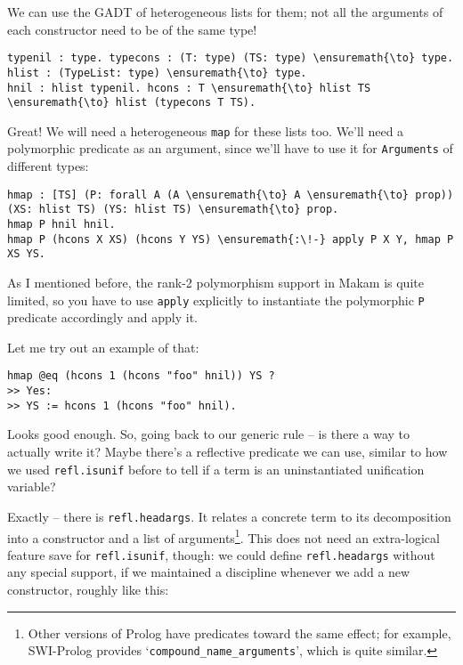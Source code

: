 \heroSTUDENT{} We can use the GADT of heterogeneous lists for them; not all
the arguments of each constructor need to be of the same type!

\begin{verbatim}
typenil : type. typecons : (T: type) (TS: type) \ensuremath{\to} type.
hlist : (TypeList: type) \ensuremath{\to} type.
hnil : hlist typenil. hcons : T \ensuremath{\to} hlist TS \ensuremath{\to} hlist (typecons T TS).
\end{verbatim}

\heroADVISOR{} Great! We will need a heterogeneous \texttt{map} for these
lists too. We'll need a polymorphic predicate as an argument, since
we'll have to use it for \texttt{Arguments} of different types:

\begin{verbatim}
hmap : [TS] (P: forall A (A \ensuremath{\to} A \ensuremath{\to} prop)) (XS: hlist TS) (YS: hlist TS) \ensuremath{\to} prop.
hmap P hnil hnil.
hmap P (hcons X XS) (hcons Y YS) \ensuremath{:\!-} apply P X Y, hmap P XS YS.
\end{verbatim}

\noindent
As I mentioned before, the rank-2 polymorphism support in Makam is quite
limited, so you have to use \texttt{apply} explicitly to instantiate the
polymorphic \texttt{P} predicate accordingly and apply it.

\heroSTUDENT{} Let me try out an example of that:

\begin{verbatim}
hmap @eq (hcons 1 (hcons "foo" hnil)) YS ?
>> Yes:
>> YS := hcons 1 (hcons "foo" hnil).
\end{verbatim}

\noindent
Looks good enough. So, going back to our generic rule -- is there a way
to actually write it? Maybe there's a reflective predicate we can use,
similar to how we used \texttt{refl.isunif} before to tell if a term is
an uninstantiated unification variable?

\heroADVISOR{} Exactly -- there is \texttt{refl.headargs}. It relates a
concrete term to its decomposition into a constructor and a list of
arguments\footnote{Other versions of Prolog have predicates toward the same effect; for example, SWI-Prolog \citep{wielemaker2012swi} provides `\texttt{compound\_{}name\_{}arguments}', which is quite similar.}.
This does not need an extra-logical feature save for
\texttt{refl.isunif}, though: we could define \texttt{refl.headargs}
without any special support, if we maintained a discipline whenever we
add a new constructor, roughly like this:

